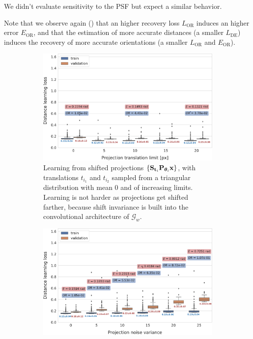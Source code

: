 We didn't evaluate sensitivity to the PSF but expect a similar behavior.

Note that we observe again () that an higher recovery loss $L_\text{OR}$ induces an higher error $E_\text{OR}$, and that the estimation of more accurate distances (a smaller $L_\text{DE}$) induces the recovery of more accurate orientations (a smaller $L_\text{OR}$ and $E_\text{OR}$).

\begin{figure}[ht!]
    \centering
    \begin{subfigure}[t]{0.47\linewidth}
        \includegraphics[width=\linewidth]{figures/de_translation_nums}
        \caption{%
            Learning from shifted projections $\{ \mathbf{S}_{\mathbf{t}_i} \mathbf{P}_{{\boldsymbol{\theta}}_i} \mathbf{x} \}$, with translations $t_{i_1}$ and $t_{i_2}$ sampled from a triangular distribution with mean 0 and of increasing limits.
            Learning is not harder as projections get shifted farther, because shift invariance is built into the convolutional architecture of $\mathcal{G}_w$.
    }\label{fig:results:distance-estimation:shift}
    \end{subfigure}
    \hfill
    \begin{subfigure}[t]{0.47\linewidth}
        \includegraphics[width=\linewidth]{figures/de_noises_nums}

\end{subfigure}
\end{figure}
